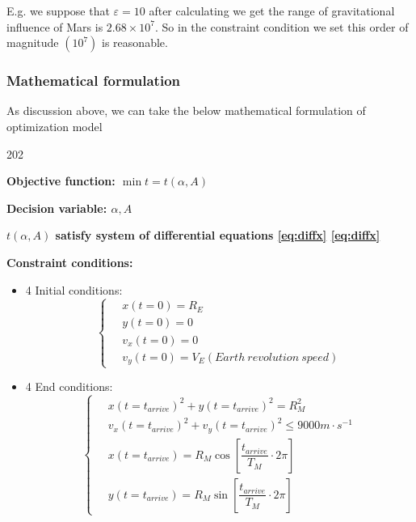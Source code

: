 \documentclass[../Paper.tex]{subfiles}
\begin{document}
E.g. we suppose that $\varepsilon = 10$ after calculating we get the range of gravitational influence of Mars 
is $2.68 \times 10^{7} $. So in the constraint condition we set this  order of magnitude $(10^7)$ is reasonable.

\subsubsection{Mathematical formulation}
As discussion above, we can take the below mathematical formulation of optimization model

\begin{dingautolist}{202}

\item \textbf{Objective function: $ \min{t = t(\alpha,A)} $ }

\item \textbf{Decision variable: $ \alpha , A $ }  

\item \textbf{$t(\alpha,A)$ satisfy system of differential equations \eqref{eq:diffx} \eqref{eq:diffx} }

\item \textbf{Constraint conditions:}

\begin{itemize}
	\item 

4 Initial conditions:
\begin{equation*}
\left\{\begin{array}{ll}
~& x(t=0) = R_{E}\\[2mm]
~& y(t=0) = 0 \\[2mm]
~& v_{x}(t=0) = 0 \\[2mm]
~& v_{y}(t=0) = V_{E}(Earth~revolution~speed) 
\end{array}\right.
\end{equation*}

\item 
4 End conditions:
\begin{equation*}
\left\{\begin{array}{ll}
~& x(t=t_{arrive})^2 + y(t=t_{arrive})^2 = R_{M}^2\\[2mm]
~& v_{x}(t=t_{arrive})^2 + v_{y}(t=t_{arrive})^2 \leq 9000 m \cdot s^{-1} \\[2mm]
~& x(t=t_{arrive}) = R_{M} \cos{ \left[ \dfrac{t_{arrive}}{T_{M}} \cdot 2\pi \right] } \\[2mm]
~& y(t=t_{arrive}) = R_{M} \sin{ \left[ \dfrac{t_{arrive}}{T_{M}} \cdot 2\pi \right] }
\end{array}\right.
\end{equation*}


\end{itemize}
\end{dingautolist}
\end{document}
